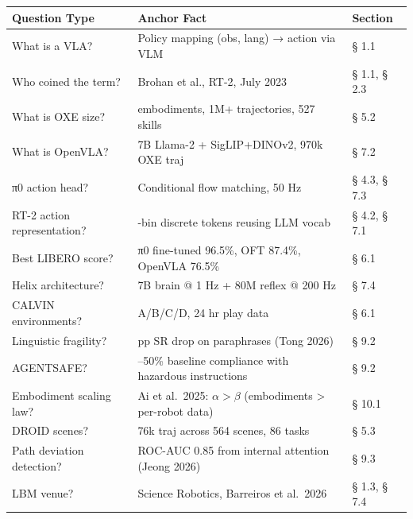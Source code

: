 {\def\LTcaptype{none} %
\begin{longtable}[]{@{}
  >{\raggedright\arraybackslash}p{}
  >{\raggedright\arraybackslash}p{}
  >{\raggedright\arraybackslash}p{}@{}}
\toprule\noalign{}
\begin{minipage}[b]{\linewidth}\raggedright
Question Type
\end{minipage} & \begin{minipage}[b]{\linewidth}\raggedright
Anchor Fact
\end{minipage} & \begin{minipage}[b]{\linewidth}\raggedright
Section
\end{minipage} \\
\midrule\noalign{}
\endhead
\bottomrule\noalign{}
\endlastfoot
What is a VLA? & Policy mapping (obs, lang) → action via VLM & § 1.1 \\
Who coined the term? & Brohan et al., RT-2, July 2023 & § 1.1, § 2.3 \\
What is OXE size? & 22 embodiments, 1M+ trajectories, 527 skills & § 5.2 \\
What is OpenVLA? & 7B Llama-2 + SigLIP+DINOv2, 970k OXE traj & § 7.2 \\
π0 action head? & Conditional flow matching, 50 Hz & § 4.3, § 7.3 \\
RT-2 action representation? & 256-bin discrete tokens reusing LLM vocab & § 4.2, § 7.1 \\
Best LIBERO score? & π0 fine-tuned 96.5\%, OFT 87.4\%, OpenVLA 76.5\% & § 6.1 \\
Helix architecture? & 7B brain @ 1 Hz + 80M reflex @ 200 Hz & § 7.4 \\
CALVIN environments? & A/B/C/D, 24 hr play data & § 6.1 \\
Linguistic fragility? & 18 pp SR drop on paraphrases (Tong 2026) & § 9.2 \\
AGENTSAFE? & 30--50\% baseline compliance with hazardous instructions & § 9.2 \\
Embodiment scaling law? & Ai et al.~2025: \(\alpha > \beta\) (embodiments \textgreater{} per-robot data) & § 10.1 \\
DROID scenes? & 76k traj across 564 scenes, 86 tasks & § 5.3 \\
Path deviation detection? & ROC-AUC 0.85 from internal attention (Jeong 2026) & § 9.3 \\
LBM venue? & Science Robotics, Barreiros et al.~2026 & § 1.3, § 7.4 \\

\end{longtable}}
